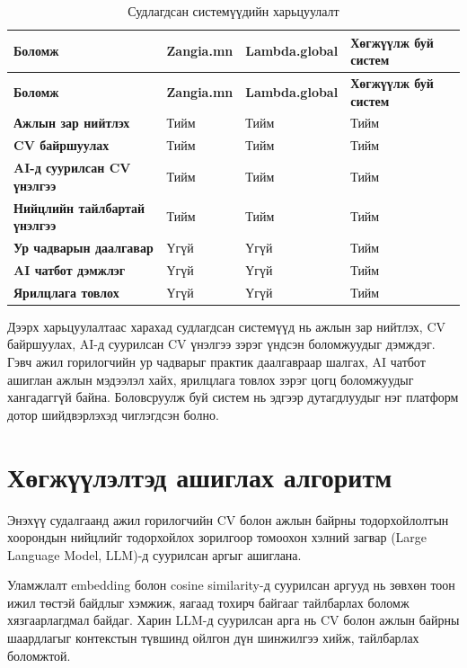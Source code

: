 \label{tab:system_comparison}
\begin{longtable}{| p{5.5cm} | p{2.6cm} | p{3cm} | p{2.8cm} |}
\caption{Судлагдсан системүүдийн харьцуулалт} \\
\hline
{\bfseries Боломж} & {\bfseries Zangia.mn} & {\bfseries Lambda.global} & {\bfseries Хөгжүүлж буй систем} \\ \hline
\endfirsthead
\hline
{\bfseries Боломж} & {\bfseries Zangia.mn} & {\bfseries Lambda.global} & {\bfseries Хөгжүүлж буй систем} \\ \hline
\endhead
{\bf Ажлын зар нийтлэх} & Тийм & Тийм & Тийм \\ \hline
{\bf CV байршуулах} & Тийм & Тийм & Тийм \\ \hline
{\bf AI-д суурилсан CV үнэлгээ} & Тийм & Тийм & Тийм \\ \hline
{\bf Нийцлийн тайлбартай үнэлгээ} & Тийм & Тийм & Тийм \\ \hline
{\bf Ур чадварын даалгавар} & Үгүй & Үгүй & Тийм \\ \hline
{\bf AI чатбот дэмжлэг} & Үгүй & Үгүй & Тийм \\ \hline
{\bf Ярилцлага товлох} & Үгүй & Үгүй & Тийм \\ \hline
\end{longtable}

\par{}Дээрх харьцуулалтаас харахад судлагдсан системүүд нь ажлын зар нийтлэх, CV байршуулах, AI-д суурилсан CV үнэлгээ зэрэг үндсэн боломжуудыг дэмждэг. Гэвч ажил горилогчийн ур чадварыг практик даалгавраар шалгах, AI чатбот ашиглан ажлын мэдээлэл хайх, ярилцлага товлох зэрэг цогц боломжуудыг хангадаггүй байна. Боловсруулж буй систем нь эдгээр дутагдлуудыг нэг платформ дотор шийдвэрлэхэд чиглэгдсэн болно.
\section{Хөгжүүлэлтэд ашиглах алгоритм}

\par{}Энэхүү судалгаанд ажил горилогчийн CV болон ажлын байрны тодорхойлолтын хоорондын нийцлийг тодорхойлох зорилгоор томоохон хэлний загвар (Large Language Model, LLM)-д суурилсан аргыг ашиглана.

\par{}Уламжлалт embedding болон cosine similarity-д суурилсан аргууд нь зөвхөн тоон ижил төстэй байдлыг хэмжиж, яагаад тохирч байгааг тайлбарлах боломж хязгаарлагдмал байдаг. Харин LLM-д суурилсан арга нь CV болон ажлын байрны шаардлагыг контекстын түвшинд ойлгон дүн шинжилгээ хийж, тайлбарлах боломжтой.

